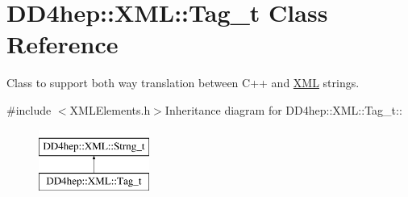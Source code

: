 \hypertarget{class_d_d4hep_1_1_x_m_l_1_1_tag__t}{
\section{DD4hep::XML::Tag\_\-t Class Reference}
\label{class_d_d4hep_1_1_x_m_l_1_1_tag__t}
}


Class to support both way translation between C++ and \hyperlink{namespace_d_d4hep_1_1_x_m_l}{XML} strings.  


{\ttfamily \#include $<$XMLElements.h$>$}Inheritance diagram for DD4hep::XML::Tag\_\-t::\begin{figure}[H]
\begin{center}
\leavevmode
\includegraphics[height=2cm]{class_d_d4hep_1_1_x_m_l_1_1_tag__t}
\end{center}
\end{figure}
